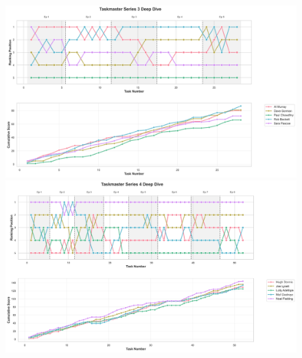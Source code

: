 \documentclass[10pt,letterpaper]{article}
\begin{document}
\begin{figure}[!h]
\centering
\includegraphics[width=\linewidth]{supfigure/series_3_deep_dive.png}
\includegraphics[width=\linewidth]{supfigure/series_4_deep_dive.png}
\end{figure}
\FloatBarrier
\clearpage
\end{document}

